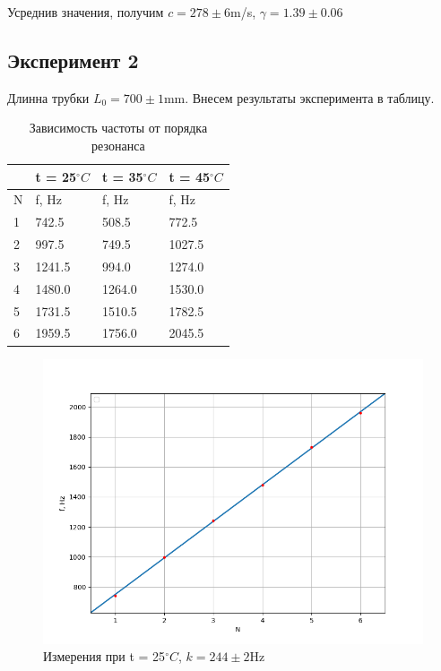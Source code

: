 \documentclass[12pt]{article}
\begin{document}
Усреднив значения, получим $c = 278\pm 6$m/s, $\gamma = 1.39\pm 0.06$

\subsection{Эксперимент 2}

Длинна трубки $L_0 = 700\pm1$mm. Внесем результаты эксперимента в таблицу.

\begin{table}[H]
	\centering
	\caption{Зависимость частоты от порядка резонанса}
	\begin{tabular}{|l|l|l|l|}
		\hline
		& t = 25$^\circ C$ & t = 35$^\circ C$ & t = 45$^\circ C$ \\ \hline
		N & f, Hz            & f, Hz            & f, Hz            \\ \hline
		1 & 742.5            & 508.5            & 772.5            \\ \hline
		2 & 997.5            & 749.5            & 1027.5           \\ \hline
		3 & 1241.5           & 994.0            & 1274.0           \\ \hline
		4 & 1480.0           & 1264.0           & 1530.0           \\ \hline
		5 & 1731.5           & 1510.5           & 1782.5           \\ \hline
		6 & 1959.5           & 1756.0           & 2045.5           \\ \hline
	\end{tabular}
\end{table}

\begin{figure}[H]
	\centering
	\includegraphics[scale = 0.5]{T25.png}
	\caption{Измерения при t = 25$^\circ C$, $k = 244 \pm 2$Hz}
\end{figure}
\end{document}
